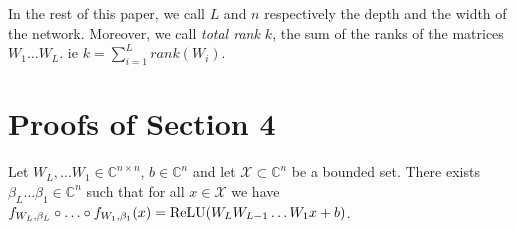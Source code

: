 In the rest of this paper, we call $L$ and $n$ respectively the depth and the width of the network. Moreover, we call {\em total rank $k$}, the sum of the ranks of the matrices $W_{1}\ldots W_{L}$. ie $k = \sum_{i=1}^L rank(W_i)$.




%



\section{Proofs of Section 4}

\begin{lemma} \label{lemma:product_of_mat_to_DNN}
Let $W_{L},\ldots W_{1}\in\mathbb{C}^{n\times n}$, $b\in\mathbb{C}^{n}$ and let $\mathcal{X}\subset\mathbb{C}^{n}$ be a bounded set.
There exists $\beta_{L} \ldots \beta_{1} \in \mathbb{C}^{n}$ such that for all $x \in \mathcal{X}$ we have $f_{W_{L},\beta_{L}} \circ \ldots \circ f_{W_{1},\beta_{1}}(x) = \relu \left(W_{L}W_{L-1} \ldots W_{1}x+b \right)$.
\end{lemma}

